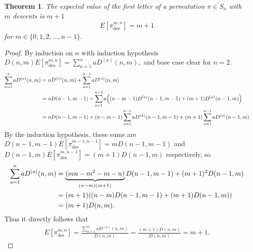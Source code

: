 \documentclass{article}
\let\originalleft\left
\let\originalright\right
\renewcommand{\left}{\mathopen{}\mathclose\bgroup\originalleft}
\renewcommand{\right}{\aftergroup\egroup\originalright}
\newtheorem{theorem}[theo]{Theorem}
\begin{document}
  \begin{theorem}
    The expected value of the first letter of a permutation $\pi \in S_n$ with $m$ descents is $m + 1$ \begin{align}
      E[\pi_\text{des}^{m, n}] =  m + 1
    \end{align} for $m \in \{0, 1, 2, \dots, n - 1\}$.
  \end{theorem}
  \begin{proof}
    By induction on $n$ with induction hypothesis $
      D(n, m)E[\pi_\text{des}^{m, n}] = \sum_{a=1}^n a D^{(a)}(n, m),
    $ and base case clear for $n = 2$.
    \begin{align}
      \sum_{a=1}^n a D^{(a)}(n, m) &= n D^{(n)}(n, m) + \sum_{a=1}^{n-1} a D^{(a)}(n, m) \\
      &= n D(n-1, m-1) + \sum_{a=1}^{n-1} a\left((n-m-1)D^{(a)}(n-1, m-1) + (m + 1)D^{(a)}(n - 1, m) \right)\\
      &= n D(n-1, m-1)
        + (n-m-1) \sum_{a=1}^{n-1} aD^{(a)}(n-1, m-1)
        + (m + 1) \sum_{a=1}^{n-1} aD^{(a)}(n - 1, m)\\
      \end{align}
      By the induction hypothesis, these sums are $D(n-1,m-1)E[\pi_\text{des}^{m-1,n-1}] = mD(n-1,m-1)$ and $D(n-1,m)E[\pi_\text{des}^{m,n-1}] = (m + 1)D(n-1,m)$ respectively, so
      \begin{align}
      \sum_{a=1}^n a D^{(a)}(n, m)
      &= \underbrace{(mn - m^2 - m - n)}_{(n-m)(m+1)}D(n-1,m-1) + (m+1)^2D(n-1,m)
      \\
      &= (m + 1)
        \left((n-m)D(n-1,m-1) + (m+1)D(n-1,m)\right)
      \\
      &= (m + 1)D(n, m).
    \end{align}
    Thus it directly follows that \begin{align}
      E[\pi_\text{des}^{m, n}] = \frac{\sum_{a=1}^n a D^{(a)}(n, m)}{D(n, m)} = \frac{(m + 1) D(n, m)}{D(n, m)} = m + 1.
    \end{align}
  \end{proof}
\end{document}
